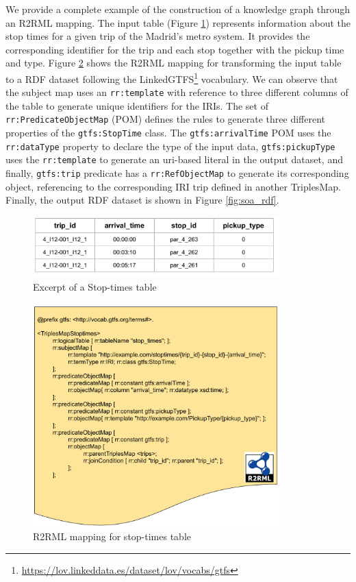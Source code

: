 We provide a complete example of the construction of a knowledge graph through an R2RML mapping. The input table (Figure \ref{fig:soa_csv}) represents information about the stop times for a given trip of the Madrid's metro system. It provides the corresponding identifier for the trip and each stop together with the pickup time and type. Figure \ref{fig:soa_r2rml} shows the R2RML mapping for transforming the input table to a RDF dataset following the LinkedGTFS\footnote{\url{https://lov.linkeddata.es/dataset/lov/vocabs/gtfs}} vocabulary. We can observe that the subject map uses an \texttt{rr:template} with reference to three different columns of the table to generate unique identifiers for the IRIs. The set of \texttt{rr:PredicateObjectMap} (POM) defines the rules to generate three different properties of the \texttt{gtfs:StopTime} class. The \texttt{gtfs:arrivalTime} POM uses the \texttt{rr:dataType} property to declare the type of the input data, \texttt{gtfs:pickupType} uses the \texttt{rr:template} to generate an uri-based literal in the output dataset, and finally, \texttt{gtfs:trip} predicate has a \texttt{rr:RefObjectMap} to generate its corresponding object, referencing to the corresponding IRI trip defined in another TriplesMap. Finally, the output RDF dataset is shown in Figure \ref{fig:soa_rdf}.

\begin{figure}[!t]
\centering
\includegraphics[width=0.85\textwidth]{figures/state-of-the-art/Stop_times CSV.pdf}
\caption{Excerpt of a Stop-times table}
\label{fig:soa_csv}
\end{figure}

\begin{figure}[!ht]
\centering
\includegraphics[width=0.85\textwidth]{figures/state-of-the-art/R2RML-example.pdf}
\caption{R2RML mapping for stop-times table}
\label{fig:soa_r2rml}
\end{figure}


